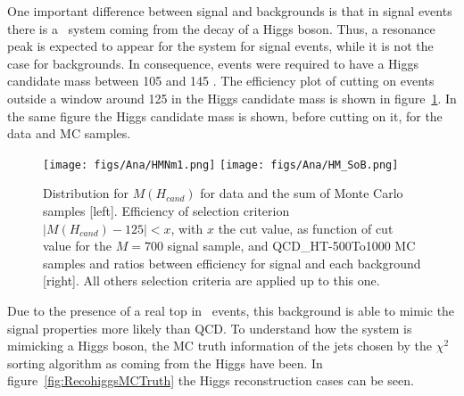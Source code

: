 One important difference between signal and backgrounds is that in signal events there is a \bbbar~system coming from the decay of a Higgs boson. Thus, a resonance peak is expected to appear for the \bbbar system for signal events, while it is not the case for backgrounds. In consequence, events were required to have a Higgs candidate mass between 105 and 145 \GeVcc. The efficiency plot of cutting on events outside a window around 125 \GeVcc in the Higgs candidate mass is shown in figure~\ref{fig:HiggsMassDMC}. In the same figure the Higgs candidate mass is shown, before cutting on it, for the data and MC samples.

\begin{figure}[!Hhtbp]
  \begin{center}
    \texttt{[image: figs/Ana/HMNm1.png]}
    \texttt{[image: figs/Ana/HM\_SoB.png]}
    \caption{Distribution for $M(H_{cand})$ for data and the sum of Monte Carlo samples [left]. Efficiency of selection criterion $|M(H_{cand})-125|<x$, with $x$ the cut value, as function of cut value for the $M=700$ \GeVcc signal sample, \ttbar and QCD\_HT-500To1000 MC samples and ratios between efficiency for signal and each background [right]. All others selection criteria are applied up to this one.}
    \label{fig:HiggsMassDMC}
  \end{center}
\end{figure}

Due to the presence of a real top in \ttbar~events, this background is able to mimic the signal properties more likely than QCD. To understand how the \ttbar system is mimicking a Higgs boson, the MC truth information of the jets chosen by the $\chi^{2}$ sorting algorithm as coming from the Higgs have been. In figure~\ref{fig:RecohiggsMCTruth} the Higgs reconstruction cases can be seen. %

